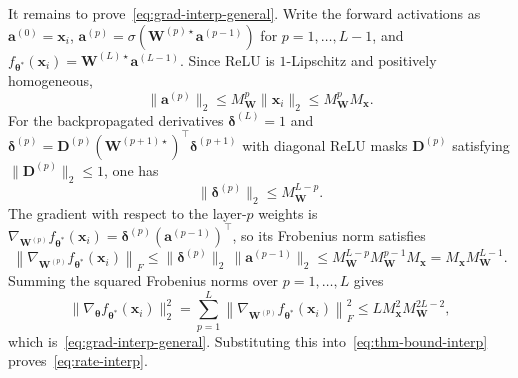 \documentclass[10pt,letterpaper]{article}
\theoremstyle{definition}
\begin{document}
It remains to prove~\eqref{eq:grad-interp-general}.
Write the forward activations as $\mathbf{a}^{(0)}=\mathbf{x}_i$,
$\mathbf{a}^{(p)}=\sigma(\mathbf{W}^{(p)\star}\mathbf{a}^{(p-1)})$ for $p=1,\dots,L-1$, and
$f_{\boldsymbol{\theta}^*}(\mathbf{x}_i)=\mathbf{W}^{(L)\star}\mathbf{a}^{(L-1)}$.
Since ReLU is $1$-Lipschitz and positively homogeneous,
\[
  \|\mathbf{a}^{(p)}\|_2 \le M_{\mathbf{W}}^{p}\|\mathbf{x}_i\|_2 \le M_{\mathbf{W}}^{p}M_{\mathbf{x}} .
\]
For the backpropagated derivatives $\boldsymbol{\delta}^{(L)}=1$ and
$\boldsymbol{\delta}^{(p)}=\mathbf{D}^{(p)}(\mathbf{W}^{(p+1)\star})^\top \boldsymbol{\delta}^{(p+1)}$ with diagonal ReLU masks $\mathbf{D}^{(p)}$ satisfying $\|\mathbf{D}^{(p)}\|_2\le 1$, one has
\[
  \|\boldsymbol{\delta}^{(p)}\|_2 \le M_{\mathbf{W}}^{L-p}.
\]
The gradient with respect to the layer-$p$ weights is
$\nabla_{\mathbf{W}^{(p)}} f_{\boldsymbol{\theta}^*}(\mathbf{x}_i)
 = \boldsymbol{\delta}^{(p)}(\mathbf{a}^{(p-1)})^\top$,
so its Frobenius norm satisfies
\[
  \left\|\nabla_{\mathbf{W}^{(p)}} f_{\boldsymbol{\theta}^*}(\mathbf{x}_i)\right\|_F
  \le \|\boldsymbol{\delta}^{(p)}\|_2\,\|\mathbf{a}^{(p-1)}\|_2
  \le M_{\mathbf{W}}^{L-p} M_{\mathbf{W}}^{p-1} M_{\mathbf{x}}
  = M_{\mathbf{x}} M_{\mathbf{W}}^{L-1}.
\]
Summing the squared Frobenius norms over $p=1,\dots,L$ gives
\[
  \bigl\|\nabla_{\boldsymbol{\theta}}f_{\boldsymbol{\theta}^*}(\mathbf{x}_i)\bigr\|_2^2
  = \sum_{p=1}^{L}\left\|\nabla_{\mathbf{W}^{(p)}} f_{\boldsymbol{\theta}^*}(\mathbf{x}_i)\right\|_F^2
  \le L M_{\mathbf{x}}^2 M_{\mathbf{W}}^{2L-2},
\]
which is~\eqref{eq:grad-interp-general}. Substituting this into~\eqref{eq:thm-bound-interp}
proves~\eqref{eq:rate-interp}.
\end{document}
